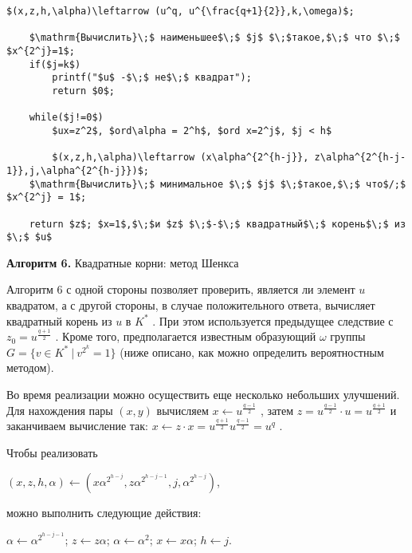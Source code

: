 %
\begin{lstlisting}[mathescape=true]
$(x,z,h,\alpha)\leftarrow (u^q, u^{\frac{q+1}{2}},k,\omega)$;
    
    $\mathrm{Вычислить}\;$ наименьшее$\;$ $j$ $\;$такое,$\;$ что $\;$ $x^{2^j}=1$;
    if($j=k$)
        printf("$u$ -$\;$ не$\;$ квадрат");
        return $0$;
    
    while($j!=0$)
        $ux=z^2$, $ord\alpha = 2^h$, $ord x=2^j$, $j < h$

        $(x,z,h,\alpha)\leftarrow (x\alpha^{2^{h-j}}, z\alpha^{2^{h-j-1}},j,\alpha^{2^{h-j}})$;
    $\mathrm{Вычислить}\;$ минимальное $\;$ $j$ $\;$такое,$\;$ что$/;$ $x^{2^j} = 1$;
   
    return $z$; $x=1$,$\;$и $z$ $\;$-$\;$ квадратный$\;$ корень$\;$ из $\;$ $u$
\end{lstlisting}


\begin{center}
{\bf Алгоритм 6.} Квадратные корни: метод Шенкса
\end{center}

Алгоритм 6 с одной стороны позволяет проверить, является ли элемент $u$
 квадратом, а с другой стороны, в случае положительного ответа, вычисляет квадратный корень из $u$
 в $K^*$
 .
При этом используется предыдущее следствие с $z_0=u^{\frac{q+1}{2}}$
. Кроме того, предполагается известным образующий $\omega$
 группы $G = \{v\in K^* \ | \ v^{2^k} = 1\}$
 (ниже описано, как можно определить вероятностным методом).

Во время реализации можно осуществить еще несколько небольших улучшений. Для нахождения пары $(x,y)$
 вычисляем $x\leftarrow u^{\frac{q-1}{2}}$
 , затем $z=u^{\frac{q-1}{2}}\cdot u = u^{\frac{q+1}{2}}$
 и заканчиваем вычисление так: $x\leftarrow z\cdot x=u^{\frac{q+1}{2}}u^{\frac{q-1}{2}}=u^q$
 .

Чтобы реализовать

\begin{center}
$(x,z,h,\alpha)\leftarrow (x\alpha^{2^{h-j}},z\alpha^{2^{h-j-1}},j,\alpha^{2^{h-j}})$,
\end{center}


\newpage

можно выполнить следующие действия:

\begin{center}
$\alpha\leftarrow\alpha^{2^{h-j-1}}$; $z\leftarrow z\alpha$; $\alpha\leftarrow\alpha^2$; $x\leftarrow x\alpha$; $h\leftarrow j$.
\end{center}


